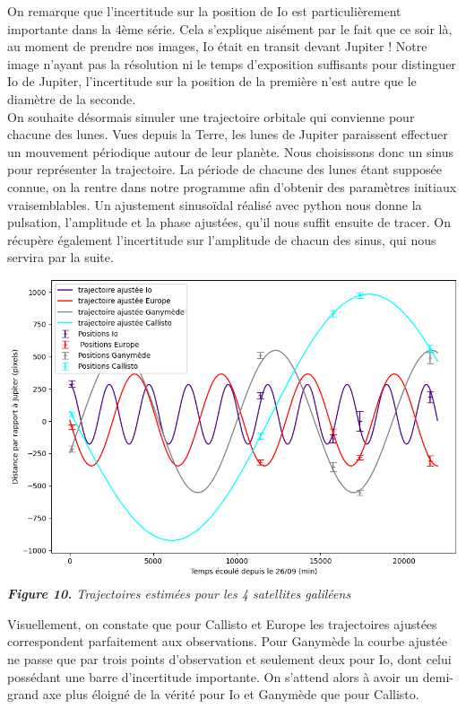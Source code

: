 \documentclass{aa}
\begin{document}
On remarque que l'incertitude sur la position de Io est particulièrement importante dans la 4ème série. Cela s'explique aisément par le fait que ce soir là, au moment de prendre nos images, Io était en transit devant Jupiter ! Notre image n'ayant pas la résolution ni le temps d'exposition suffisants pour distinguer Io de Jupiter, l'incertitude sur la position de la première n'est autre que le diamètre de la seconde. \\
On souhaite désormais simuler une trajectoire orbitale qui convienne pour chacune des lunes. Vues depuis la Terre, les lunes de Jupiter paraissent effectuer un mouvement périodique autour de leur planète. Nous choisissons donc un sinus pour représenter la trajectoire. La période de chacune des lunes étant supposée connue, on la rentre dans notre programme afin d'obtenir des paramètres initiaux vraisemblables. Un ajustement sinusoïdal réalisé avec python nous donne la pulsation, l'amplitude et la phase ajustées, qu'il nous suffit ensuite de tracer. On récupère également l'incertitude sur l'amplitude de chacun des sinus, qui nous servira par la suite.
\begin{center}
\includegraphics[scale = 0.5]{images/trajectoires.PNG}\\
\emph{{\textbf{Figure 10.} Trajectoires estimées pour les 4 satellites galiléens}}
\end{center}
Visuellement, on constate que pour Callisto et Europe les trajectoires ajustées correspondent parfaitement aux observations.
Pour Ganymède la courbe ajustée ne passe que par trois points d'observation et seulement deux pour Io, dont celui possédant une barre d'incertitude importante. On s'attend alors à avoir un demi-grand axe plus éloigné de la vérité pour Io et Ganymède que pour Callisto.\\
\end{document}
